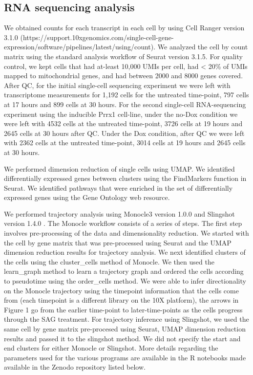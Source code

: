 \subsection{RNA sequencing analysis}
We obtained counts for each transcript in each cell by using Cell Ranger version 3.1.0 (https://support.10xgenomics.com/single-cell-gene-expression/software/pipelines/latest/using/count).  We analyzed the cell by count matrix using the standard analysis workflow of Seurat version 3.1.5.\cite{Butler2018-jc,Stuart2019-ra} For quality control, we kept cells that had at-least 10,000 UMIs per cell, had < 20\% of UMIs mapped to mitochondrial genes, and had between 2000 and 8000 genes covered. After QC, for the initial single-cell sequencing experiment we were left with transcriptome measurements for 1,192 cells for the untreated time-point, 797 cells at 17 hours and 899 cells at 30 hours. For the second single-cell RNA-sequencing experiment using the inducible Prrx1 cell-line, under the no-Dox condition we were left with 4532 cells at the untreated time-point, 3726 cells at 19 hours and 2645 cells at 30 hours after QC. Under the Dox condition, after QC we were left with 2362 cells at the untreated time-point, 3014 cells at 19 hours and 2645 cells at 30 hours. 

We performed dimension reduction of single cells using UMAP\cite{McInnes2018-sm}. We identified differentially expressed genes between clusters using the FindMarkers function in Seurat.  We identified pathways that were enriched in the set of differentially expressed genes using the Gene Ontology web resource\cite{Ashburner2000-id,Mi2019-pi,Gene_Ontology_Consortium2021-mx}.

We performed trajectory analysis using Monocle3 version 1.0.0\cite{Trapnell2014-ho,Qiu2017-uz} and Slingshot version 1.4.0 \cite{Street2018-ak}. The Monocle workflow consists of a series of steps. The first step involves pre-processing of the data and dimensionality reduction. We started with the cell by gene matrix that was pre-processed using Seurat and the UMAP dimension reduction results for trajectory analysis. We next identified clusters of the cells using the cluster\_cells method of Monocle. We then used the learn\_graph method to learn a trajectory graph and ordered the cells according to pseudotime using the order\_cells method. We were able to infer directionality on the Monocle trajectory using the timepoint information that the cells come from (each timepoint is a different library on the 10X platform), the arrows in Figure 1 go from the earlier time-point to later-time-points as the cells progress through the SAG treatment. For trajectory inference using Slingshot, we used the same cell by gene matrix pre-procesed using Seurat, UMAP dimension reduction results and passed it to the slingshot method. We did not specify the start and end clusters for either Monocle or Slingshot.  More details regarding the parameters used for the various programs are available in the R notebooks made available in the Zenodo repository listed below. 

